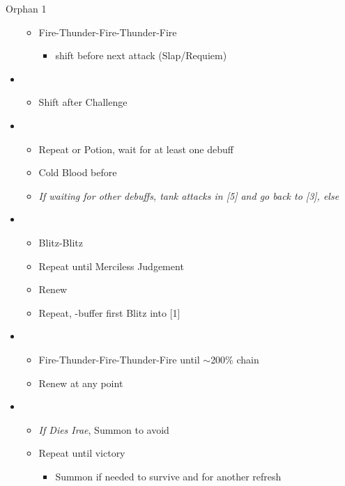 \begin{battle}{Orphan 1}
\begin{itemize}
			\begin{itemize}
				\item Fire-Thunder-Fire-Thunder-Fire
					\begin{itemize}
						\item shift before next attack (Slap/Requiem)
					\end{itemize}
			\end{itemize}
		\item \fifth
			\begin{itemize}
				\item Shift after Challenge
			\end{itemize}
		\item \third
			\begin{itemize}
				\item Repeat or Potion, wait for at least one debuff
				\item Cold Blood before \stagger
				\item \textit{If waiting for other debuffs, tank attacks in [5] and go back to [3], else}
			\end{itemize}
		\item \fourth
			\begin{itemize}
				\item Blitz-Blitz
				\item Repeat until Merciless Judgement
				\item Renew
				\item Repeat, \rav-buffer first Blitz into [1]
			\end{itemize}
		\item \sixth
			\begin{itemize}
				\item Fire-Thunder-Fire-Thunder-Fire until $\sim$200\% chain
				\item Renew at any point
			\end{itemize}
		\item \fourth
			\begin{itemize}
				\item \textit{If Dies Irae}, Summon to avoid
				\item Repeat until victory
					\begin{itemize}
						\item Summon if needed to survive and for another refresh
					\end{itemize}
			\end{itemize}
	\end{itemize}
\end{battle}

